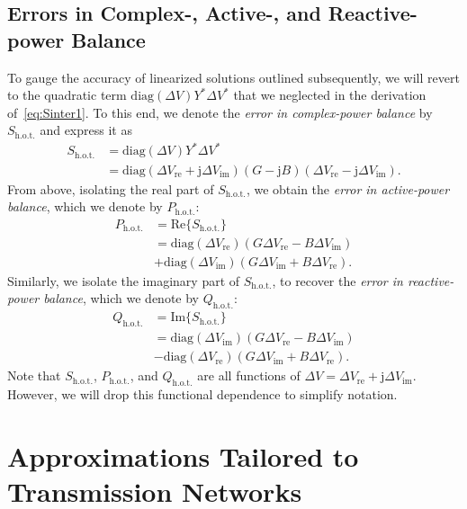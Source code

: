 \documentclass[10 pt, conference]{ieeeconf}
\begin{document}
\subsection{Errors in Complex-, Active-, and Reactive-power Balance}
To gauge the accuracy of linearized solutions outlined subsequently, we will revert to the quadratic term $\mathrm{diag}(\Delta V)Y^* \Delta V^*$ that we neglected in the derivation of~\eqref{eq:Sinter1}. To this end, we denote the \emph{error in complex-power balance} by $S_\mathrm{h.o.t.}$ and express it as
\begin{align} \label{eq:Shot}
S_\mathrm{h.o.t.} &= \mathrm{diag}(\Delta V)Y^* \Delta V^* \\
&=\mathrm{diag}(\Delta V_\mathrm{re} + \mathrm j \Delta V_\mathrm{im}) (G - \mathrm j B) (\Delta V_\mathrm{re} - \mathrm j \Delta V_\mathrm{im}). \nonumber
\end{align}
From above, isolating the real part of $S_\mathrm{h.o.t.}$, we obtain the \emph{error in active-power balance}, which we denote by $P_\mathrm{h.o.t.}$:
\begin{align} 
P_\mathrm{h.o.t.} &= \mathrm{Re}\{S_\mathrm{h.o.t.}\}  \nonumber \\
&=  \mathrm{diag}\left(\Delta V_\mathrm{re}\right) (G \Delta V_\mathrm{re} - B \Delta V_\mathrm{im}) \nonumber \\ 
                  &+  \mathrm{diag}\left(\Delta V_\mathrm{im}\right) (G \Delta V_\mathrm{im} + B \Delta V_\mathrm{re}). \label{eq:Phot}
\end{align}
Similarly, we isolate the imaginary part of $S_\mathrm{h.o.t.}$, to recover the \emph{error in reactive-power balance}, which we denote by $Q_\mathrm{h.o.t.}$:        
\begin{align}          
Q_\mathrm{h.o.t.} &= \mathrm{Im}\{S_\mathrm{h.o.t.}\} \nonumber \\
&= \mathrm{diag}\left(\Delta V_\mathrm{im}\right) (G \Delta V_\mathrm{re} - B \Delta V_\mathrm{im}) \nonumber \\
                  &- \mathrm{diag}\left(\Delta V_\mathrm{re}\right) (G \Delta V_\mathrm{im} + B \Delta V_\mathrm{re}). \label{eq:Qhot}
\end{align}
Note that $S_\mathrm{h.o.t.}$, $P_\mathrm{h.o.t.}$, and $Q_\mathrm{h.o.t.}$ are all functions of $\Delta V = \Delta V_\mathrm{re} + \mathrm j \Delta V_\mathrm{im}$. However, we will drop this functional dependence to simplify notation. 

\section{Approximations Tailored to Transmission Networks} \label{sec:Transmission}
\end{document}
